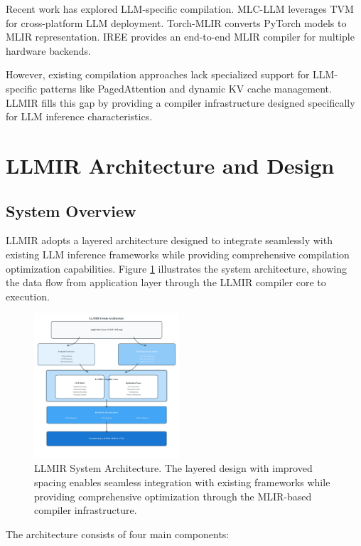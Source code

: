 \documentclass[conference]{IEEEtran}
\begin{document}
Recent work has explored LLM-specific compilation. MLC-LLM \cite{b15} leverages TVM for cross-platform LLM deployment. Torch-MLIR \cite{b16} converts PyTorch models to MLIR representation. IREE \cite{b17} provides an end-to-end MLIR compiler for multiple hardware backends.

However, existing compilation approaches lack specialized support for LLM-specific patterns like PagedAttention and dynamic KV cache management. LLMIR fills this gap by providing a compiler infrastructure designed specifically for LLM inference characteristics.

\section{LLMIR Architecture and Design}

\subsection{System Overview}

LLMIR adopts a layered architecture designed to integrate seamlessly with existing LLM inference frameworks while providing comprehensive compilation optimization capabilities. Figure \ref{fig:architecture} illustrates the system architecture, showing the data flow from application layer through the LLMIR compiler core to execution.

\begin{figure}[htbp]
\centering
\includegraphics[width=0.48\textwidth]{figures/llmir_architecture.pdf}
\caption{LLMIR System Architecture. The layered design with improved spacing enables seamless integration with existing frameworks while providing comprehensive optimization through the MLIR-based compiler infrastructure.}
\label{fig:architecture}
\end{figure}

The architecture consists of four main components:
\end{document}
